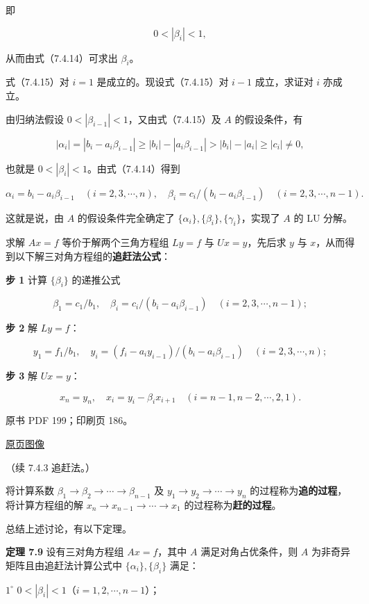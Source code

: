 \documentclass[
  10pt,
  fontset=fandol]{ctexart}
\begin{document}
即

\[
0<|\beta_i|<1,
\]

从而由式（7.4.14）可求出 \(\beta_i\)。

式（7.4.15）对 \(i=1\) 是成立的。现设式（7.4.15）对 \(i-1\) 成立，求证对
\(i\) 亦成立。

由归纳法假设 \(0<|\beta_{i-1}|<1\)，又由式（7.4.15）及 \(A\)
的假设条件，有

\[
|\alpha_i|=|b_i-a_i\beta_{i-1}|\geqslant|b_i|-|a_i\beta_{i-1}|>|b_i|-|a_i|\geqslant|c_i|\neq0,
\]

也就是 \(0<|\beta_i|<1\)。由式（7.4.14）得到

\[
\alpha_i=b_i-a_i\beta_{i-1}\quad(i=2,3,\cdots,n),\quad
\beta_i=c_i/(b_i-a_i\beta_{i-1})\quad(i=2,3,\cdots,n-1).
\]

这就是说，由 \(A\) 的假设条件完全确定了
\(\{\alpha_i\},\{\beta_i\},\{\gamma_i\}\)，实现了 \(A\) 的 LU 分解。

求解 \(Ax=f\) 等价于解两个三角方程组 \(Ly=f\) 与 \(Ux=y\)，先后求 \(y\)
与 \(x\)，从而得到以下解三对角方程组的\textbf{追赶法公式}：

\textbf{步 1} 计算 \(\{\beta_i\}\) 的递推公式

\[
\beta_1=c_1/b_1,\quad\beta_i=c_i/(b_i-a_i\beta_{i-1})\quad(i=2,3,\cdots,n-1);
\]

\textbf{步 2} 解 \(Ly=f\)：

\[
y_1=f_1/b_1,\quad y_i=(f_i-a_iy_{i-1})/(b_i-a_i\beta_{i-1})\quad(i=2,3,\cdots,n);
\]

\textbf{步 3} 解 \(Ux=y\)：

\[
x_n=y_n,\quad x_i=y_i-\beta_ix_{i+1}\quad(i=n-1,n-2,\cdots,2,1).
\]

\clearpage

原书 PDF 199；印刷页 186。

\href{../../../source-images/pdf-199.jpeg}{原页图像}

（续 7.4.3 追赶法。）

将计算系数 \(\beta_1\to\beta_2\to\cdots\to\beta_{n-1}\) 及
\(y_1\to y_2\to\cdots\to y_n\)
的过程称为\textbf{追的过程}，将计算方程组的解
\(x_n\to x_{n-1}\to\cdots\to x_1\) 的过程称为\textbf{赶的过程}。

总结上述讨论，有以下定理。

\textbf{定理 7.9} 设有三对角方程组 \(Ax=f\)，其中 \(A\)
满足对角占优条件，则 \(A\) 为非奇异矩阵且由追赶法计算公式中
\(\{\alpha_i\},\{\beta_i\}\) 满足：

\(1^\circ\) \(0<|\beta_i|<1\)（\(i=1,2,\cdots,n-1\)）；
\end{document}
